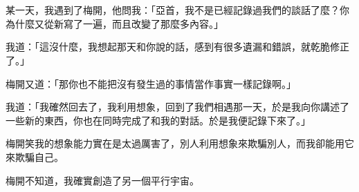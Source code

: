 \chapter*{}
某一天，我遇到了梅開，他問我：「亞首，我不是已經記錄過我們的談話了麼？你為什麼又從新寫了一遍，而且改變了那麼多內容。」

我道：「這沒什麼，我想起那天和你說的話，感到有很多遺漏和錯誤，就乾脆修正了。」

梅開又道：「那你也不能把沒有發生過的事情當作事實一樣記錄啊。」

我道：「我確然回去了，我利用想象，回到了我們相遇那一天，於是我向你講述了一些新的東西，你也在同時完成了和我的對話。於是我便記錄下來了。」

梅開笑我的想象能力實在是太過厲害了，別人利用想象來欺騙別人，而我卻能用它來欺騙自己。

梅開不知道，我確實創造了另一個平行宇宙。
